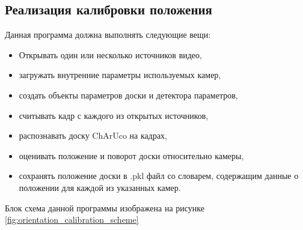 \documentclass[12pt, a4paper]{article}
\begin{document}
\subsection{Реализация калибровки положения}
Данная программа должна выполнять следующие вещи:
\begin{itemize}
  \item Открывать один или несколько источников видео,
  \item загружать внутренние параметры используемых камер,
  \item создать объекты параметров доски и детектора параметров,
  \item считывать кадр с каждого из открытых источников,
  \item распознавать доску ChArUco на кадрах,
  \item оценивать положение и поворот доски относительно камеры,
  \item сохранять положение доски в .pkl файл со словарем, содержащим данные о
    положении для каждой из указанных камер.
\end{itemize}

Блок схема данной программы изображена на рисунке \ref{fig:orientation_calibration_scheme}
\end{document}
